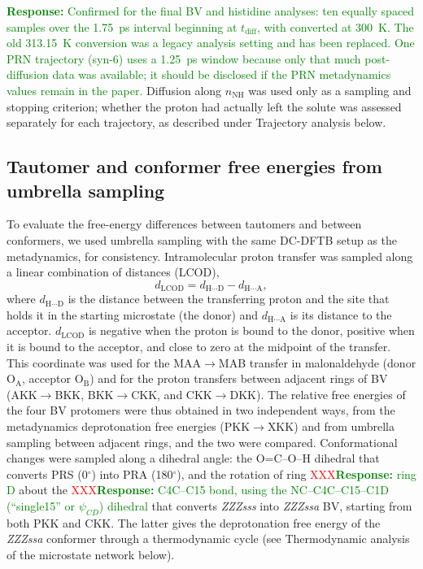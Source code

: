 \textcolor{green}{\textbf{Response:} Confirmed for the final BV and histidine analyses: ten equally spaced samples over the 1.75~ps interval beginning at $t_{\mathrm{diff}}$, with \pka{} converted at 300~K. The old 313.15~K conversion was a legacy analysis setting and has been replaced. One PRN trajectory (syn-6) uses a 1.25~ps window because only that much post-diffusion data was available; it should be disclosed if the PRN metadynamics values remain in the paper.}
Diffusion along $n_{\mathrm{NH}}$ was used only as a sampling and stopping criterion; whether the proton had actually left the solute was assessed separately for each trajectory, as described under Trajectory analysis below.

\subsection{Tautomer and conformer free energies from umbrella sampling}

To evaluate the free-energy differences between tautomers and between conformers, we used umbrella sampling\cite{kastnerUmbrellaSampling2011} with the same DC-DFTB setup as the metadynamics, for consistency.
Intramolecular proton transfer was sampled along a linear combination of distances (LCOD),
\begin{equation}
d_{\mathrm{LCOD}} = d_{\mathrm{H}\cdots\mathrm{D}} - d_{\mathrm{H}\cdots\mathrm{A}},
\label{eq:lcod}
\end{equation}
where $d_{\mathrm{H}\cdots\mathrm{D}}$ is the distance between the transferring proton and the site that holds it in the starting microstate (the donor) and $d_{\mathrm{H}\cdots\mathrm{A}}$ is its distance to the acceptor.
$d_{\mathrm{LCOD}}$ is negative when the proton is bound to the donor, positive when it is bound to the acceptor, and close to zero at the midpoint of the transfer.
This coordinate was used for the MAA$\rightarrow$MAB transfer in malonaldehyde (donor O$_\mathrm{A}$, acceptor O$_\mathrm{B}$) and for the proton transfers between adjacent rings of BV (AKK$\rightarrow$BKK, BKK$\rightarrow$CKK, and CKK$\rightarrow$DKK).
The relative free energies of the four BV protomers were thus obtained in two independent ways, from the metadynamics deprotonation free energies (PKK$\rightarrow$XKK) and from umbrella sampling between adjacent rings, and the two were compared.
Conformational changes were sampled along a dihedral angle: the O=C--O--H dihedral that converts PRS (0$^\circ$) into PRA (180$^\circ$), and the rotation of ring \textcolor{red}{XXX}\textcolor{green}{\textbf{Response:} ring D} about the \textcolor{red}{XXX}\textcolor{green}{\textbf{Response:} C4C--C15 bond, using the NC--C4C--C15--C1D (``single15'' or $\psi_{CD}$) dihedral} that converts \textit{ZZZsss} into \textit{ZZZssa} BV,\cite{tongManyRoadsSeam2026} starting from both PKK and CKK.
The latter gives the deprotonation free energy of the \textit{ZZZssa} conformer through a thermodynamic cycle (see Thermodynamic analysis of the microstate network below).

